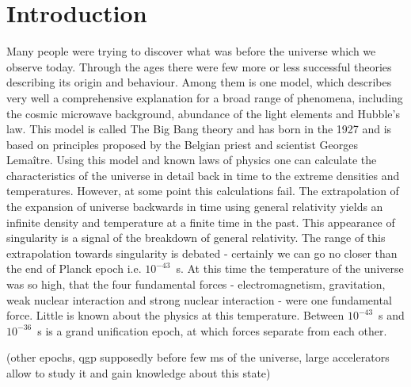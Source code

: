 \chapter*{Introduction}
Many people were trying to discover what was before the universe which we observe today.
Through the ages there were few more or less successful theories describing its origin and behaviour.
Among them is one model, which describes very well a comprehensive explanation for a broad range of phenomena, including the cosmic microwave background, abundance of the light elements and Hubble's law.
This model is called The Big Bang theory and has born in the 1927 and is based on principles proposed by the Belgian priest and scientist Georges Lema{\^i}tre.
Using this model and known laws of physics one can calculate the characteristics of the universe in detail back in time to the extreme densities and temperatures.
However, at some point this calculations fail.
The extrapolation of the expansion of universe backwards in time using general relativity yields an infinite density and temperature at a finite time in the past.
This appearance of singularity is a signal of the breakdown of general relativity.
The range of this extrapolation towards singularity is debated - certainly we can go no closer than the end of Planck epoch i.e. $10^{-43}$~s.
At this time the temperature of the universe was so high, that the four fundamental forces - electromagnetism, gravitation, weak nuclear interaction and strong nuclear interaction - were one fundamental force.
Little is known about the physics at this temperature.
Between $10^{-43}$~s and $10^{-36}$~s is a grand unification epoch, at which forces separate from each other.

(other epochs, qgp supposedly before few ms of the universe, large accelerators allow to study it and gain knowledge about this state)
